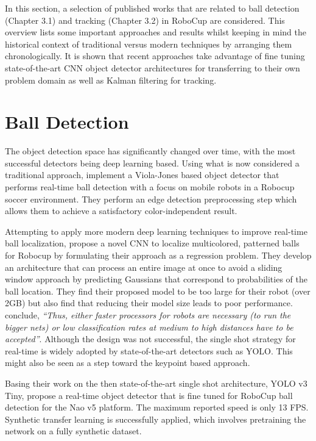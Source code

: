 \documentclass[a4paper,twoside,12pt]{report}
\begin{document}
In this section, a selection of published works that are related to ball detection  (Chapter 3.1) and tracking (Chapter 3.2) in RoboCup are considered. This overview lists some important approaches and results whilst keeping in mind the historical context of traditional versus modern techniques by arranging them chronologically. It is shown that recent approaches take advantage of fine tuning state-of-the-art CNN object detector architectures for transferring to their own problem domain as well as Kalman filtering for tracking.

\section{Ball Detection}
\label{section:balldetection}

The object detection space has significantly changed over time, with the most successful detectors being deep learning based. Using what is now considered a traditional approach, \cite{robovj} implement a Viola-Jones based object detector that performs real-time ball detection with a focus on mobile robots in a Robocup soccer environment. They perform an edge detection preprocessing step which allows them to achieve a satisfactory color-independent result.

Attempting to apply more modern deep learning techniques to improve real-time ball localization, \cite{selfcnn} propose a novel CNN to localize multicolored, patterned balls for Robocup by formulating their approach as a regression problem. They develop an architecture that can process an entire image at once to avoid a sliding window approach by predicting Gaussians that correspond to probabilities of the ball location. They find their proposed model to be too large for their robot (over 2GB) but also find that reducing their model size leads to poor performance. \cite{selfcnn} conclude, \textit{``Thus, either faster processors for robots are necessary (to run the bigger nets) or low classification rates at medium to high distances have to be accepted''}. Although the design was not successful, the single shot strategy for real-time is widely adopted by state-of-the-art detectors such as YOLO. This might also be seen as a step toward the keypoint based approach.

\pagebreak

Basing their work on the then state-of-the-art single shot architecture, YOLO v3 Tiny, \cite{robo} propose a real-time object detector that is fine tuned for RoboCup ball detection for the Nao v5 platform. The maximum reported speed is only 13 FPS. Synthetic transfer learning is successfully applied, which involves pretraining the network on a fully synthetic dataset. 
\end{document}
